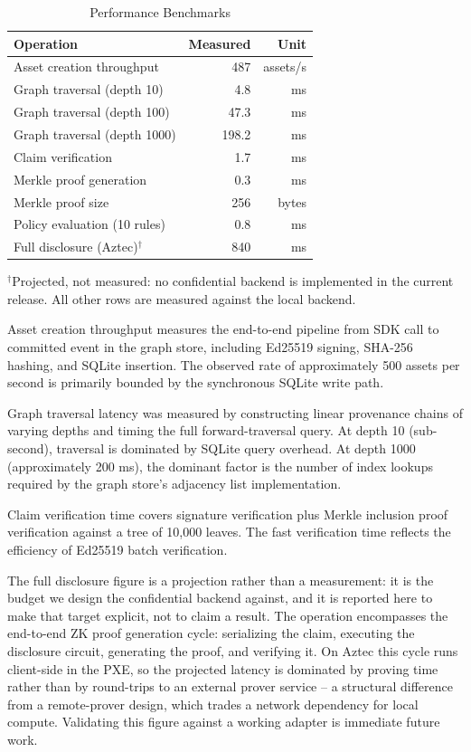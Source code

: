 \documentclass[conference]{IEEEtran}
\begin{document}
\begin{table}[t]
\centering
\caption{Performance Benchmarks}
\label{tab:benchmarks}
\begin{tabular}{@{}l r r@{}}
\toprule
\textbf{Operation} & \textbf{Measured} & \textbf{Unit} \\
\midrule
Asset creation throughput  & 487       & assets/s \\
Graph traversal (depth 10)  &   4.8     & ms \\
Graph traversal (depth 100) &  47.3     & ms \\
Graph traversal (depth 1000)& 198.2     & ms \\
Claim verification           &   1.7     & ms \\
Merkle proof generation      &   0.3     & ms \\
Merkle proof size            & 256       & bytes \\
Policy evaluation (10 rules) &   0.8     & ms \\
Full disclosure (Aztec)$^{\dagger}$ & 840       & ms \\
\bottomrule
\end{tabular}

\vspace{2pt}
{\footnotesize $^{\dagger}$Projected, not measured: no confidential backend is
implemented in the current release.  All other rows are measured against the
local backend.}
\end{table}

Asset creation throughput measures the end-to-end pipeline from SDK call to
committed event in the graph store, including Ed25519 signing, SHA-256
hashing, and SQLite insertion.  The observed rate of approximately 500 assets
per second is primarily bounded by the synchronous SQLite write path.

Graph traversal latency was measured by constructing linear provenance chains
of varying depths and timing the full forward-traversal query.  At depth 10
(sub-second), traversal is dominated by SQLite query overhead.  At depth 1000
(approximately 200 ms), the dominant factor is the number of index lookups
required by the graph store's adjacency list implementation.

Claim verification time covers signature verification plus Merkle inclusion
proof verification against a tree of 10,000 leaves.  The fast verification
time reflects the efficiency of Ed25519 batch verification.

The full disclosure figure is a projection rather than a measurement: it is
the budget we design the confidential backend against, and it is reported here
to make that target explicit, not to claim a result.  The operation encompasses
the end-to-end ZK proof generation cycle: serializing the claim, executing the
disclosure circuit, generating the proof, and verifying it.  On Aztec this cycle
runs client-side in the PXE, so the projected latency is dominated by proving
time rather than by round-trips to an external prover service -- a structural
difference from a remote-prover design, which trades a network dependency for
local compute.  Validating this figure against a working adapter is immediate
future work.
\end{document}
